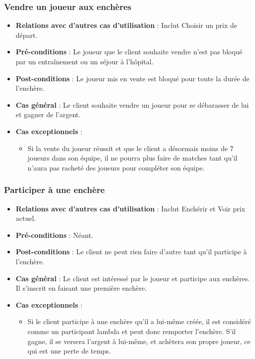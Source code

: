 \documentclass[a4paper,titlepage]{scrreprt}
\begin{document}
    \subsubsection{Vendre un joueur aux enchères}
      \begin{itemize}
        \item \textbf{Relations avec d'autres cas d'utilisation}  : Inclut Choisir un prix de départ.
        \item \textbf{Pré-conditions} : Le joueur que le client souhaite vendre n'est pas bloqué par un entraînement ou un séjour à l'hôpital.
        \item \textbf{Post-conditions} : Le joueur mis en vente est bloqué pour toute la durée de l'enchère.
        \item \textbf{Cas général} : Le client souhaite vendre un joueur pour se débarasser de lui et gagner de l'argent.
        \item \textbf{Cas exceptionnels} :
          \begin{itemize}
            \item Si la vente du joueur réussit et que le client a désormais moins de 7 joueurs dans son équipe, il ne pourra plus faire de matches tant qu'il n'aura pas racheté des joueurs pour compléter son équipe.
          \end{itemize}
      \end{itemize}

    \subsubsection{Participer à une enchère}
      \begin{itemize}
        \item \textbf{Relations avec d'autres cas d'utilisation}  : Inclut Enchérir et Voir prix actuel.
        \item \textbf{Pré-conditions} : Néant.
        \item \textbf{Post-conditions} : Le client ne peut rien faire d'autre tant qu'il participe à l'enchère.
        \item \textbf{Cas général} : Le client est intéressé par le joueur et participe aux enchères. Il s'inscrit en faisant une première enchère.
        \item \textbf{Cas exceptionnels} :
          \begin{itemize}
            \item Si le client participe à une enchère qu'il a lui-même créée, il est considéré comme un participant lambda et peut donc remporter l'enchère. S'il gagne, il se versera l'argent à lui-même, et achètera son propre joueur, ce qui est une perte de temps.
          \end{itemize}
      \end{itemize}
\end{document}
